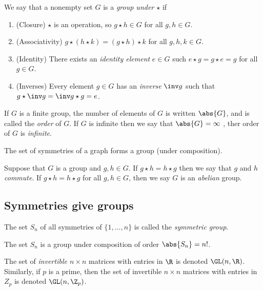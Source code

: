 \documentclass{article}
\begin{document}
\setcounter{theorem}{2}
\begin{definition}
    We say that a nonempty set $G$ is a \emph{group under $\star$} if
    \begin{enumerate}
        \item (Closure) $\star$ is an operation, so $g\star h\in G$ for all $g,h\in G$.
        \item (Associativity) $g\star (h \star k)=(g\star h)\star k$ for all $g,h,k\in G$.
        \item (Identity) There exists an \emph{identity element} $e\in G$ such $e\star g = g\star e = g$
              for all $g\in G$.
        \item (Inverses) Every element $g\in G$ has an \emph{inverse} $\inv g$ 
              such that $g\star \inv g= \inv g \star g = e$.
    \end{enumerate}
    If $G$ is a finite group, the number of elements of $G$ is written $\abs{G}$, and is called the
    \emph{order} of $G$. If $G$ is infinite then we say that $\abs{G}=\infty$ , ther order of $G$
    is \emph{infinite}.
\end{definition}

\begin{theorem}
    The set of symmetries of a graph forms a group (under composition).
\end{theorem}

\setcounter{theorem}{5}
\begin{definition}
    Suppose that $G$ is a group and $g,h\in G$. If $g\star h = h\star g$ then we say
    that $g$ and $h$ \emph{commute}. If $g\star h=h\star g$ for all $g,h\in G$, then
    we say $G$ is an \emph{abelian} group.
\end{definition}

\subsection{Symmetries give groups}

\setcounter{theorem}{1}
\begin{definition}
    The set $S_n$ of all symmetries of $\{1,...,n\}$ is called the \emph{symmetric group}. 
\end{definition}

\begin{lemma}
    The set $S_n$ is a group under composition of order $\abs{S_n}=n!$.
\end{lemma}

\setcounter{theorem}{4}
\begin{definition}
    The set of \emph{invertible $n\times n$} matrices with entries in $\R$ is denoted
    $\GL(n,\R)$. Similarly, if $p$ is a prime, then the set of invertible $n\times n$
    matrices with entries in $Z_p$ is denoted $\GL(n,\Z_p)$.
\end{definition}
\end{document}
